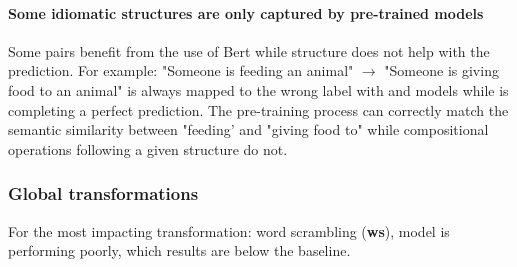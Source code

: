 \paragraph{Some idiomatic structures are only captured by pre-trained models}

Some pairs benefit from the use of Bert while structure does not help with the prediction. For example: "Someone is feeding an animal" $\rightarrow$ "Someone is giving food to an animal" is always mapped to the wrong label with \dep and \const models while \cls is completing a perfect prediction. The \bert pre-training process can correctly match the semantic similarity between "feeding' and "giving food to" while compositional operations following a given structure do not.

\subsubsection{Global transformations} 

For the most impacting transformation: word scrambling (\textbf{ws}), \cls model is performing poorly, which results are below the baseline. 


